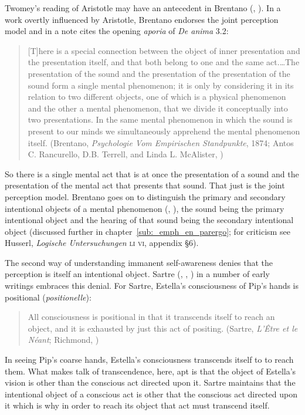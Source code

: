 Twomey's reading of Aristotle may have an antecedent in Brentano (\citealt[2.2.8]{Brentano:1874aa}, \citealt[1.4, 2.1]{Brentano:1929aa}). In a work overtly influenced by Aristotle, Brentano endorses the joint perception model and in a note cites the opening \emph{aporia} of \emph{De anima} 3.2:
\begin{quote}
	[T]here is a special connection between the object of inner presentation and the presentation itself, and that both belong to one and the same act.\ldots The presentation of the sound and the presentation of the presentation of the sound form a single mental phenomenon; it is only by considering it in its relation to two different objects, one of which is a physical phenomenon and the other a mental phenomenon, that we divide it conceptually into two presentations. In the same mental phenomenon in which the sound is present to our minds we simultaneously apprehend the mental phenomenon itself. (Brentano, \emph{Psychologie Vom Empirischen Standpunkte}, 1874; Antos C. Rancurello, D.B. Terrell, and Linda L. McAlister, \citeyear{Brentano:1973})
\end{quote}
So there is a single mental act that is at once the presentation of a sound and the presentation of the mental act that presents that sound. That just is the joint perception model. Brentano goes on to distinguish the primary and secondary intentional objects of a mental phenomenon (\citealt[2.2.8]{Brentano:1874aa}, \citealt[1.4, 2.1]{Brentano:1929aa}), the sound being the primary intentional object and the hearing of that sound being the secondary intentional object (discussed further in chapter~\ref{sub:_emph_en_parergo}; for criticism see Husserl, \emph{Logische Untersuchungen} \textsc{li vi}, appendix §6).

The second way of understanding immanent self-awareness denies that the perception is itself an intentional object. Sartre (\citeyear{Sartre:1936cr}, \citeyear{Sartre:1940fe}, \citeyear{Sartre:1943aa}) in a number of early writings embraces this denial. For Sartre, Estella's consciousness of Pip's hands is positional (\emph{positionelle}):
\begin{quote}
	All consciousness is positional in that it transcends itself to reach an object, and it is exhausted by just this act of positing. (Sartre, \emph{L'\^{E}tre et le N\'{e}ant}; Richmond, \citeyear[10]{Sartre:2018aa})
\end{quote}
In seeing Pip's coarse hands, Estella's consciousness transcends itself to to reach them. What makes talk of transcendence, here, apt is that the object of Estella's vision is other than the conscious act directed upon it. Sartre maintains that the intentional object of a conscious act is other that the conscious act directed upon it which is why in order to reach its object that act must transcend itself.

